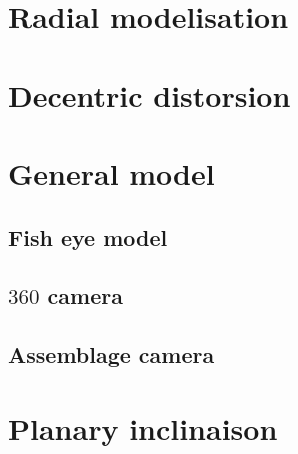
\section{Radial modelisation}



\section{Decentric distorsion}



\section{General model}

\subsection{Fish eye model}
\subsection{$360$ camera}
\subsection{Assemblage camera}


\section{Planary inclinaison}




